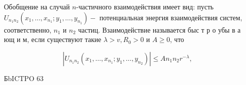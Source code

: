 \documentclass[10pt]{article}
\begin{document}
Обобщение на случай $n$-частичного взаимодействия имеет вид: пусть $U_{n_{1} n_{2}}\left(x_{1}, \ldots, x_{n_{1}} ; y_{1}, \ldots, y_{n_{1}}\right)-$ потенциальная энергия взаимодействия систем, соответственно, $n_{1}$ и $n_{2}$ частиц. Взаимодействие называется быс т р о убы в а ющ и м, если существуют такие $\lambda>v, R_{0}>0$ и $A \geqslant 0$, что



\[

\left|U_{n_{1} n_{2}}\left(x_{1}, \ldots, x_{n_{1}} ; y_{1}, \ldots, y_{n_{2}}\right)\right| \leqslant A n_{1} n_{2} r^{-\lambda} \text {, }

\]



БbICTPO 63
\end{document}
